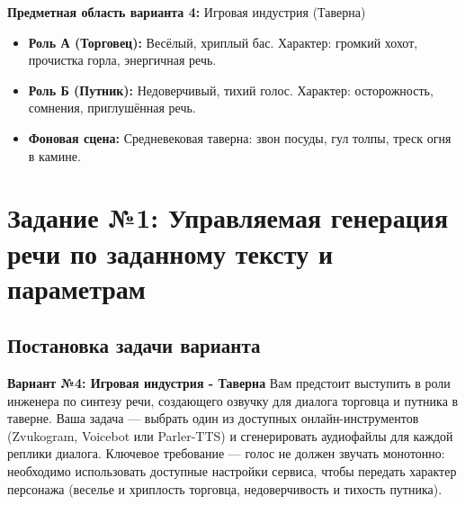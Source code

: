\documentclass[oneside,a4paper,14pt]{extarticle}
\begin{document}
\noindent\textbf{Предметная область варианта 4:} Игровая индустрия (Таверна)
\begin{itemize}
    \item \textbf{Роль А (Торговец):} Весёлый, хриплый бас. Характер: громкий хохот, прочистка горла, энергичная речь.
    \item \textbf{Роль Б (Путник):} Недоверчивый, тихий голос. Характер: осторожность, сомнения, приглушённая речь.
    \item \textbf{Фоновая сцена:} Средневековая таверна: звон посуды, гул толпы, треск огня в камине.
\end{itemize}
\newpage

\section{Задание №1: Управляемая генерация речи по заданному тексту и параметрам}
\subsection{Постановка задачи варианта}
\noindent\textbf{Вариант №4: Игровая индустрия - Таверна}
\noindent Вам предстоит выступить в роли инженера по синтезу речи, создающего озвучку для диалога торговца и путника в таверне. Ваша задача — выбрать один из доступных онлайн-инструментов (Zvukogram, Voicebot или Parler-TTS) и сгенерировать аудиофайлы для каждой реплики диалога. Ключевое требование — голос не должен звучать монотонно: необходимо использовать доступные настройки сервиса, чтобы передать характер персонажа (веселье и хриплость торговца, недоверчивость и тихость путника).
\end{document}
